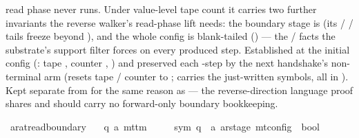 \begin{isabellebody}
\begin{isamarkuptext}
  read phase never runs.  Under value-level tape count it carries two
  further invariants the reverse walker's read-phase lift needs: the
  boundary stage is  (its  /
   /  tails freeze beyond ),
  and the whole config is blank-tailed () — the  /
   facts the substrate's 
  support filter forces on every produced step.  Established at the
  initial config
  (: tape , counter ,
  ) and preserved each -step by
  the next handshake's non-terminal arm (resets tape / counter to
  ;  carries the just-written symbols, all in
  \isa{{\isasymGamma}}).  Kept separate from  for
  the same reason as  — the
  reverse-direction language proof shares  and
  should carry no forward-only boundary bookkeeping.%
\end{isamarkuptext}\isamarkuptrue%
\isamarkupfalse%
\ ar{\isacharunderscore}{\kern0pt}at{\isacharunderscore}{\kern0pt}read{\isacharunderscore}{\kern0pt}boundary\ {\isacharcolon}{\kern0pt}{\isacharcolon}{\kern0pt}\isanewline
\ \ {\isachardoublequoteopen}{\isacharparenleft}{\kern0pt}{\isacharprime}{\kern0pt}q{\isacharcomma}{\kern0pt}\ {\isacharprime}{\kern0pt}a{\isacharparenright}{\kern0pt}\ mttm\isanewline
\ \ \ \ {\isasymRightarrow}\ {\isacharparenleft}{\kern0pt}sym{}{\isacharcomma}{\kern0pt}\ {\isacharprime}{\kern0pt}q\ {\isasymtimes}\ {\isacharprime}{\kern0pt}a\ ar{\isacharunderscore}{\kern0pt}stage{\isacharparenright}{\kern0pt}\ mt{\isacharunderscore}{\kern0pt}config\ {\isasymRightarrow}\ bool{\isachardoublequoteclose}\ \isanewline

\end{isabellebody}
